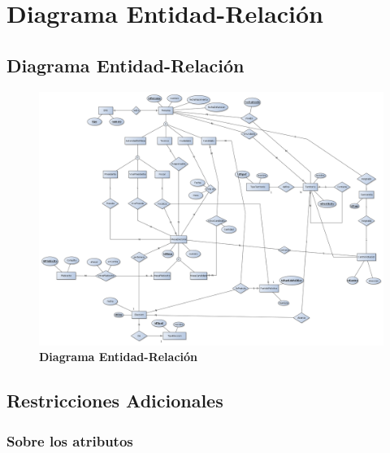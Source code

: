 \section{Diagrama Entidad-Relación}
\subsection{Diagrama Entidad-Relación}
\begin{figure}[H]
   \begin{center}
   \includegraphics[angle=90,scale=0.32]{graphics/der.png}
   \caption{\textbf{Diagrama Entidad-Relación}}
   \label{fig:der}
   \end{center}
\end{figure}

\subsection{Restricciones Adicionales}

\subsubsection{Sobre los atributos}

